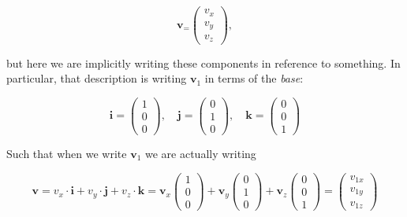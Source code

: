 \documentclass{book}
\begin{document}
\begin{equation}
	\mathbf{v}_ = \begin{pmatrix} v_{x} \\ v_{y} \\ v_{z} \end{pmatrix},
\end{equation}

but here we are implicitly writing these components in reference to something. In particular, that description is writing $\mathbf{v}_1$ in terms of the \textit{base}:

\begin{equation}
	\mathbf{i} = \begin{pmatrix} 1 \\ 0 \\ 0 \end{pmatrix}, \quad
	\mathbf{j} = \begin{pmatrix} 0 \\ 1 \\ 0 \end{pmatrix}, \quad
	\mathbf{k} = \begin{pmatrix} 0 \\ 0 \\ 1 \end{pmatrix} 
\end{equation}

Such that when we write $\mathbf{v}_1$ we are actually writing

\begin{equation}
	\mathbf{v} = v_x \cdot \mathbf{i} + v_y \cdot \mathbf{j} + v_z \cdot \mathbf{k} = 
	\mathbf{v}_x \begin{pmatrix} 1 \\ 0 \\ 0 \end{pmatrix} + 
	\mathbf{v}_y \begin{pmatrix} 0 \\ 1 \\ 0 \end{pmatrix} + 
	\mathbf{v}_z \begin{pmatrix} 0 \\ 0 \\ 1 \end{pmatrix} =
	\begin{pmatrix} v_{1x} \\ v_{1y} \\ v_{1z} \end{pmatrix}
\end{equation}
\end{document}
